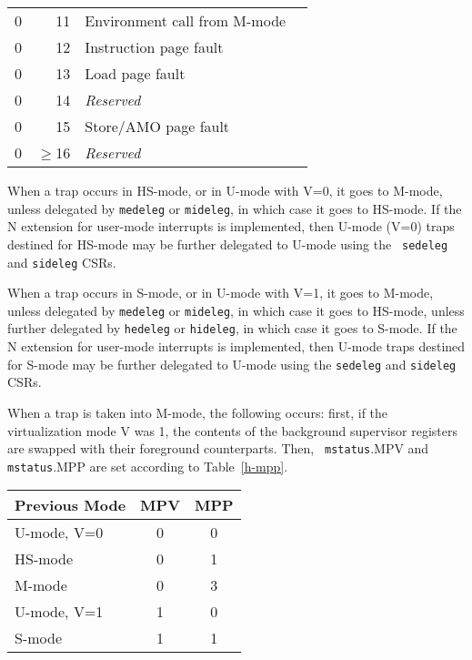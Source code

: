 \begin{table*}[h!]
\begin{center}
\begin{tabular}{|r|r|l|l|}
  0         & 11              & Environment call from M-mode \\
  0         & 12              & Instruction page fault \\
  0         & 13              & Load page fault \\
  0         & 14              & {\em Reserved} \\
  0         & 15              & Store/AMO page fault \\
  0         & $\ge$16         & {\em Reserved} \\
  \hline
\end{tabular}
\end{center}
\caption{Supervisor and machine cause register ({\tt scause} and {\tt mcause}) values when the hypervisor extension is enabled.}
\label{hcauses}
\end{table*}

When a trap occurs in HS-mode, or in U-mode with V=0, it goes to M-mode, unless
delegated by {\tt medeleg} or {\tt mideleg}, in which case it goes to HS-mode.
If the N extension for user-mode interrupts is implemented, then U-mode (V=0)
traps destined for HS-mode may be further delegated to U-mode using the {\tt
sedeleg} and {\tt sideleg} CSRs.

When a trap occurs in S-mode, or in U-mode with V=1, it goes to M-mode, unless
delegated by {\tt medeleg} or {\tt mideleg}, in which case it goes to HS-mode,
unless further delegated by {\tt hedeleg} or {\tt hideleg}, in which case it
goes to S-mode.  If the N extension for user-mode interrupts is implemented,
then U-mode traps destined for S-mode may be further delegated to U-mode
using the {\tt sedeleg} and {\tt sideleg} CSRs.

When a trap is taken into M-mode, the following occurs: first, if the
virtualization mode V was 1, the contents of the background supervisor
registers are swapped with their foreground counterparts.  Then, {\tt
mstatus}.MPV and {\tt mstatus}.MPP are set according to Table~\ref{h-mpp}.

\begin{table*}[h!]
\begin{center}
\begin{tabular}{|l|c|c|}
  \hline
  Previous Mode & MPV & MPP \\ \hline
  U-mode, V=0   & 0   & 0   \\
  HS-mode       & 0   & 1   \\
  M-mode        & 0   & 3   \\ \hline
  U-mode, V=1   & 1   & 0   \\
  S-mode        & 1   & 1   \\ \hline
\end{tabular}
\end{center}
\caption{Value of {\tt mstatus} fields MPV and MPP after a trap into M-mode.
Upon trap return, MPV is ignored when MPP=3.}
\label{h-mpp}
\end{table*}

